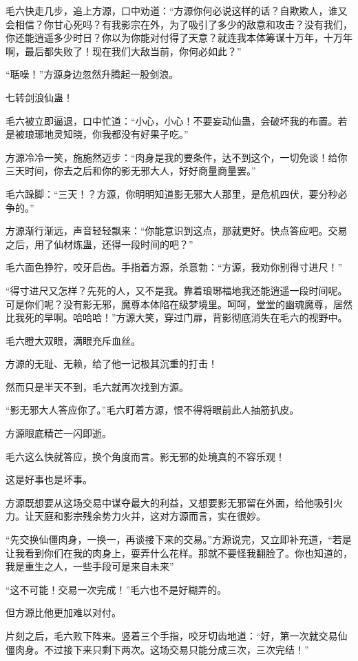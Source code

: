 \begin{this_body}
毛六快走几步，追上方源，口中劝道：“方源你何必说这样的话？自欺欺人，谁又会相信？你甘心死吗？有我影宗在外，为了吸引了多少的敌意和攻击？没有我们，你还能逍遥多少时日？你以为你能对付得了天意？就连我本体筹谋十万年，十万年啊，最后都失败了！现在我们大敌当前，你何必如此？”

“聒噪！”方源身边忽然升腾起一股剑浪。

七转剑浪仙蛊！

毛六被立即逼退，口中忙道：“小心，小心！不要妄动仙蛊，会破坏我的布置。若是被琅琊地灵知晓，你我都没有好果子吃。”

方源冷冷一笑，施施然迈步：“肉身是我的要条件，达不到这个，一切免谈！给你三天时间，你去之后和你的影无邪大人，好好商量商量罢。”

毛六跺脚：“三天！？方源，你明明知道影无邪大人那里，是危机四伏，要分秒必争的。”

方源渐行渐远，声音轻轻飘来：“你能意识到这点，那就更好。快点答应吧。交易之后，用了仙材炼蛊，还得一段时间的吧？”

毛六面色狰狞，咬牙启齿。手指着方源，杀意勃：“方源，我劝你别得寸进尺！”

“得寸进尺又怎样？先死的人，又不是我。靠着琅琊福地我还能逍遥一段时间呢。可是你们呢？没有影无邪，魔尊本体陷在级梦境里。呵呵，堂堂的幽魂魔尊，居然比我死的早啊。哈哈哈！”方源大笑，穿过门扉，背影彻底消失在毛六的视野中。

毛六瞪大双眼，满眼充斥血丝。

方源的无耻、无赖，给了他一记极其沉重的打击！

然而只是半天不到，毛六就再次找到方源。

“影无邪大人答应你了。”毛六盯着方源，恨不得将眼前此人抽筋扒皮。

方源眼底精芒一闪即逝。

毛六这么快就答应，换个角度而言。影无邪的处境真的不容乐观！

这是好事也是坏事。

方源既想要从这场交易中谋夺最大的利益，又想要影无邪留在外面，给他吸引火力。让天庭和影宗残余势力火并，这对方源而言，实在很妙。

“先交换仙僵肉身，一换一，再谈接下来的交易。”方源说完，又立即补充道，“若是让我看到你们在我的肉身上，耍弄什么花样。那就不要怪我翻脸了。你也知道的，我是重生之人，一些手段可是来自未来”

“这不可能！交易一次完成！”毛六也不是好糊弄的。

但方源比他更加难以对付。

片刻之后，毛六败下阵来。竖着三个手指，咬牙切齿地道：“好，第一次就交易仙僵肉身。不过接下来只剩下两次。这场交易只能分成三次，三次完结！”


\end{this_body}
